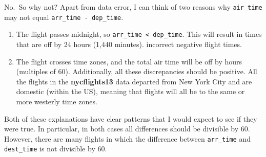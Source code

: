 \documentclass[]{book}
\newenvironment{Shaded}{\begin{snugshade}}{\end{snugshade}}
\newcommand{\CommentTok}[1]{\textcolor[rgb]{0.56,0.35,0.01}{\textit{#1}}}
\newcommand{\DecValTok}[1]{\textcolor[rgb]{0.00,0.00,0.81}{#1}}
\newcommand{\KeywordTok}[1]{\textcolor[rgb]{0.13,0.29,0.53}{\textbf{#1}}}
\newcommand{\NormalTok}[1]{#1}
\newcommand{\OperatorTok}[1]{\textcolor[rgb]{0.81,0.36,0.00}{\textbf{#1}}}
\newcommand{\StringTok}[1]{\textcolor[rgb]{0.31,0.60,0.02}{#1}}
\theoremstyle{plain}
\theoremstyle{remark}
\begin{document}
No.~So why not? Apart from data error, I can think of two reasons why
\texttt{air\_time} may not equal \texttt{arr\_time\ -\ dep\_time}.

\begin{enumerate}
\def\labelenumi{\arabic{enumi}.}
\item
  The flight passes midnight, so
  \texttt{arr\_time\ \textless{}\ dep\_time}. This will result in times
  that are off by 24 hours (1,440 minutes). incorrect negative flight
  times.
\item
  The flight crosses time zones, and the total air time will be off by
  hours (multiples of 60). Additionally, all these discrepancies should
  be positive. All the flights in the \textbf{nycflights13} data
  departed from New York City and are domestic (within the US), meaning
  that flights will all be to the same or more westerly time zones.
\end{enumerate}

Both of these explanations have clear patterns that I would expect to
see if they were true. In particular, in both cases all differences
should be divisible by 60. However, there are many flights in which the
difference between \texttt{arr\_time} and \texttt{dest\_time} is not
divisible by 60.

\begin{Shaded}
\end{Shaded}
\end{document}
